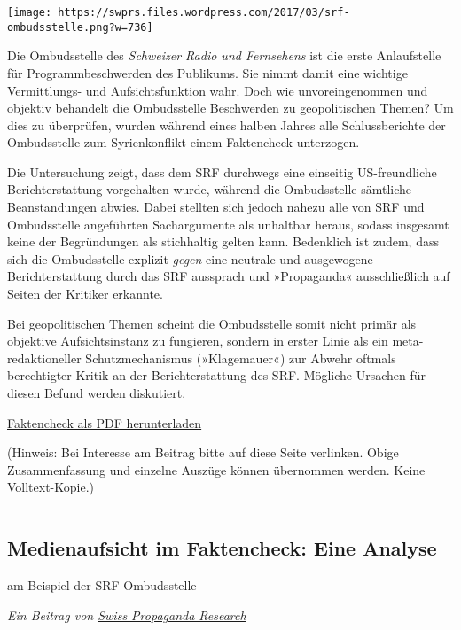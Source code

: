 \texttt{[image: https://swprs.files.wordpress.com/2017/03/srf-ombudsstelle.png?w=736]}

Die Ombudsstelle des \emph{Schweizer Radio und Fernsehens} ist die erste
Anlaufstelle für Programmbeschwerden des Publikums. Sie nimmt damit eine
wichtige Vermittlungs- und Aufsichtsfunktion wahr. Doch wie
unvoreingenommen und objektiv behandelt die Ombudsstelle Beschwerden zu
geopolitischen Themen? Um dies zu überprüfen, wurden während eines
halben Jahres alle Schlussberichte der Ombudsstelle zum Syrienkonflikt
einem Faktencheck unterzogen.

Die Untersuchung zeigt, dass dem SRF durchwegs eine einseitig
US-freundliche Berichterstattung vorgehalten wurde, während die
Ombudsstelle sämtliche Beanstandungen abwies. Dabei stellten sich jedoch
nahezu alle von SRF und Ombudsstelle angeführten Sachargumente als
unhaltbar heraus, sodass insgesamt keine der Begründungen als
stichhaltig gelten kann. Bedenklich ist zudem, dass sich die
Ombudsstelle explizit \emph{gegen} eine neutrale und ausgewogene
Berichterstattung durch das SRF aussprach und »Propaganda«
ausschließlich auf Seiten der Kritiker erkannte.

Bei geopolitischen Themen scheint die Ombudsstelle somit nicht primär
als objektive Aufsichtsinstanz zu fungieren, sondern in erster Linie als
ein meta-redaktioneller Schutzmechanismus (»Klagemauer«) zur Abwehr
oftmals berechtigter Kritik an der Berichterstattung des SRF. Mögliche
Ursachen für diesen Befund werden diskutiert.

\href{https://swprs.files.wordpress.com/2017/08/faktencheck-srf-ombudsstelle-mv.pdf}{Faktencheck
als PDF herunterladen}

(Hinweis: Bei Interesse am Beitrag bitte auf diese Seite verlinken.
Obige Zusammen­fassung und einzelne Auszüge können übernommen werden.
Keine Volltext-Kopie.)

\begin{center}\rule{0.5\linewidth}{\linethickness}\end{center}

\hypertarget{medienaufsicht-im-faktencheck-eine-analyse}{%
\subsection{Medienaufsicht im Faktencheck: Eine
Analyse}\label{medienaufsicht-im-faktencheck-eine-analyse}}

am Beispiel der SRF-Ombudsstelle

\emph{Ein Beitrag von \href{https://swprs.org/}{Swiss Propaganda
Research}}

